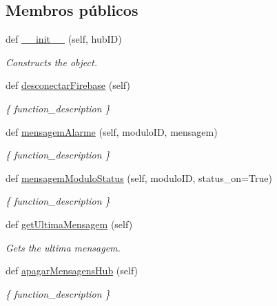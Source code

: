 \subsection*{Membros públicos}
\begin{DoxyCompactItemize}
\item 
def \hyperlink{classhub_para_firebase_1_1_hub_para_firebase_a8553e4a8f4a5564e69a1ebac33e255b3}{\+\_\+\+\_\+init\+\_\+\+\_\+} (self, hub\+ID)
\begin{DoxyCompactList}\small\item\em Constructs the object. \end{DoxyCompactList}\item 
def \hyperlink{classhub_para_firebase_1_1_hub_para_firebase_a8867ea8f38db645837f1c0ab0a4b207e}{desconectar\+Firebase} (self)
\begin{DoxyCompactList}\small\item\em \{ function\+\_\+description \} \end{DoxyCompactList}\item 
def \hyperlink{classhub_para_firebase_1_1_hub_para_firebase_aec0b9ed7691e78978716075fe999019a}{mensagem\+Alarme} (self, modulo\+ID, mensagem)
\begin{DoxyCompactList}\small\item\em \{ function\+\_\+description \} \end{DoxyCompactList}\item 
def \hyperlink{classhub_para_firebase_1_1_hub_para_firebase_af5dec8c9d356d058cbe37907a395ef0c}{mensagem\+Modulo\+Status} (self, modulo\+ID, status\+\_\+on=True)
\begin{DoxyCompactList}\small\item\em \{ function\+\_\+description \} \end{DoxyCompactList}\item 
def \hyperlink{classhub_para_firebase_1_1_hub_para_firebase_a8c00d07d181c47e4567b602947466abe}{get\+Ultima\+Mensagem} (self)
\begin{DoxyCompactList}\small\item\em Gets the ultima mensagem. \end{DoxyCompactList}\item 
def \hyperlink{classhub_para_firebase_1_1_hub_para_firebase_a434ba152fb00900dddfaf2f61e5d78b6}{apagar\+Mensagens\+Hub} (self)
\begin{DoxyCompactList}\small\item\em \{ function\+\_\+description \} \end{DoxyCompactList}\item 

\end{DoxyCompactItemize}
